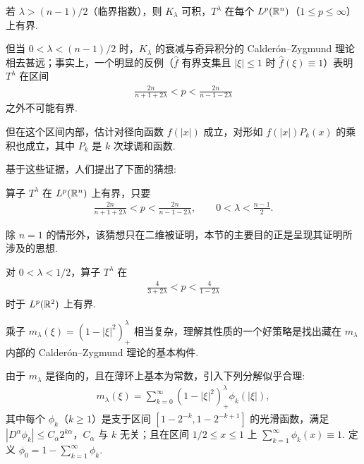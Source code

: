 若 $\lambda > (n-1)/2$（临界指数），则 $K_\lambda$ 可积，$T^\lambda$ 在每个 $L^p(\mathbb{R}^n)$（$1 \leq p \leq \infty$）上有界.

但当 $0 < \lambda < (n-1)/2$ 时，$K_\lambda$ 的衰减与奇异积分的 Calderón--Zygmund 理论相去甚远；事实上，一个明显的反例（$\widehat{f}$ 有界支集且 $|\xi| \leq 1$ 时 $\widehat{f}(\xi) \equiv 1$）表明 $T^\lambda$ 在区间
\begin{align*}
  \frac{2n}{n+1+2\lambda}<p<\frac{2n}{n-1-2\lambda}
\end{align*}
之外不可能有界.

但在这个区间内部，估计对径向函数 $f(|x|)$ 成立，对形如 $f(|x|)P_k(x)$ 的乘积也成立，其中 $P_k$ 是 $k$ 次球调和函数.

基于这些证据，人们提出了下面的猜想:

\begin{conjecture}\label{conj:5.5}
算子 $T^\lambda$ 在 $L^p(\mathbb{R}^n)$ 上有界，只要
\begin{align*}
  \frac{2n}{n+1+2\lambda}<p<\frac{2n}{n-1-2\lambda},\qquad 0<\lambda<\frac{n-1}{2}.
\end{align*}
\end{conjecture}

除 $n = 1$ 的情形外，该猜想只在二维被证明，本节的主要目的正是呈现其证明所涉及的思想.

\begin{theorem}\label{thm:5.6}
对 $0 < \lambda < 1/2$，算子 $T^\lambda$ 在
\begin{align*}
  \frac{4}{3+2\lambda}<p<\frac{4}{1-2\lambda}
\end{align*}
时于 $L^p(\mathbb{R}^2)$ 上有界.
\end{theorem}

乘子 $m_\lambda(\xi) = (1 - |\xi|^2)_{+}^\lambda$ 相当复杂，理解其性质的一个好策略是找出藏在 $m_\lambda$ 内部的 Calderón--Zygmund 理论的基本构件.

由于 $m_{\lambda}$ 是径向的，且在薄环上基本为常数，引入下列分解似乎合理:
\begin{align*}
  m_{\lambda}(\xi)=\sum_{k=0}^{\infty}(1-|\xi|^{2})_{+}^{\lambda}\phi_{k}(|\xi|),
\end{align*}
其中每个 $\phi_k$（$k \geq 1$）是支于区间 $[1-2^{-k}, 1-2^{-k+1}]$ 的光滑函数，满足 $|D^\alpha \phi_k| \leq C_\alpha 2^{k\alpha}$，$C_\alpha$ 与 $k$ 无关；且在区间 $1/2 \leq x \leq 1$ 上 $\sum_{k=1}^{\infty} \phi_k(x) \equiv 1$. 定义 $\phi_0 = 1 - \sum_{k=1}^{\infty} \phi_k$.

